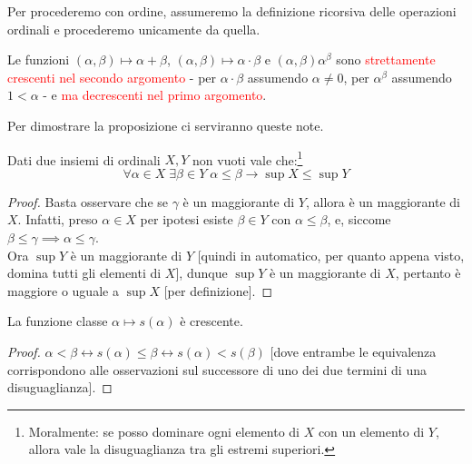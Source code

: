 \documentclass[11pt]{scrartcl}
\begin{document}
\begin{note}
	Per procederemo con ordine, assumeremo la definizione ricorsiva delle operazioni ordinali e procederemo unicamente da quella.
\end{note}

\begin{proposition}
	Le funzioni $(\alpha,\beta)\mapsto \alpha + \beta$, $(\alpha,\beta) \mapsto \alpha \cdot \beta$ e $(\alpha,\beta) \alpha^\beta$ sono \textcolor{red}{strettamente crescenti nel secondo argomento} - per $\alpha \cdot \beta$ assumendo $\alpha \ne 0$,
	per $\alpha^\beta$ assumendo $1<\alpha$ - e \textcolor{red}{ma decrescenti nel primo argomento}.
\end{proposition}

Per dimostrare la proposizione ci serviranno queste note.

\begin{note}
	Dati due insiemi di ordinali $X,Y$ non vuoti vale che:\footnote{Moralmente: se posso dominare ogni elemento di $X$ con un elemento di $Y$, allora vale la disuguaglianza tra gli estremi superiori.}
	\[ \forall \alpha \in X \; \exists \beta \in Y \; \alpha \leq \beta \rightarrow \sup X \leq \sup Y
		\]
\end{note}

\begin{proof}
	Basta osservare che se $\gamma$ è un maggiorante di $Y$, allora è un maggiorante di $X$.
	Infatti, preso $\alpha \in X$ per ipotesi esiste $\beta \in Y$ con $\alpha \leq \beta$, e, siccome $\beta \leq \gamma \implies \alpha \leq \gamma$.\\
	Ora $\sup Y$ è un maggiorante di $Y$ [quindi in automatico, per quanto appena visto, domina tutti gli elementi di $X$], dunque $\sup Y$ è un maggiorante di $X$, pertanto è maggiore o uguale a $\sup X$ [per definizione].
\end{proof}

\begin{note}
	La funzione classe $\alpha \mapsto s(\alpha)$ è crescente.
\end{note}

\begin{proof}
	$\alpha < \beta \leftrightarrow s(\alpha) \leq \beta \leftrightarrow s(\alpha) < s(\beta)$ [dove entrambe le equivalenza corrispondono alle osservazioni sul successore di uno dei due termini di una disuguaglianza].
\end{proof}
\end{document}
